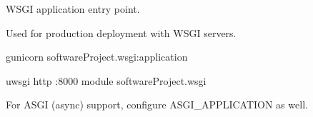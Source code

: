 \documentclass[letterpaper,10pt,english]{sphinxmanual}
\begin{document}

\begin{fulllineitems}
\label{\detokenize{softwareProject:softwareProject.settings.WSGI_APPLICATION}}
\pysigstartsignatures
\pysigline
{}
\pysigstopsignatures
\sphinxAtStartPar
WSGI application entry point.

\sphinxAtStartPar
Used for production deployment with WSGI servers.
\begin{description}
\sphinxAtStartPar
gunicorn softwareProject.wsgi:application

\sphinxAtStartPar
uwsgi \textendash{}http :8000 \textendash{}module softwareProject.wsgi

\end{description}

\sphinxAtStartPar
For ASGI (async) support, configure ASGI\_APPLICATION as well.

\end{fulllineitems}

\end{document}
